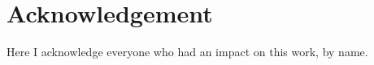 
\chapter*{Acknowledgement}
Here I acknowledge everyone who had an impact on this work, by name.

\newpage
